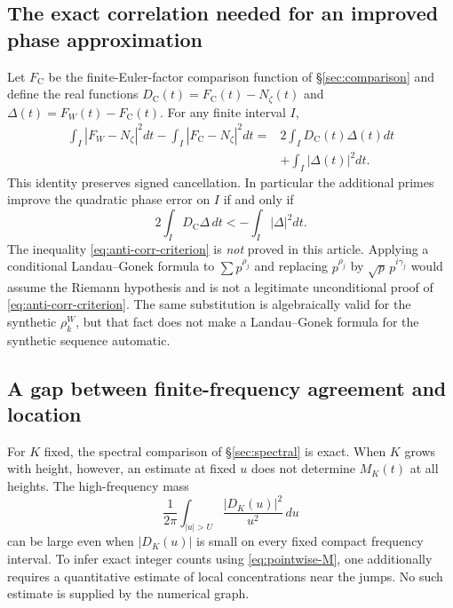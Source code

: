 \documentclass[11pt,leqno]{amsart}
\numberwithin{equation}{section}
\theoremstyle{definition}
\theoremstyle{remark}
\newcommand{\1}{\mathbf 1}
\begin{document}
\subsection{The exact correlation needed for an improved phase approximation}
Let $F_{\mathrm C}$ be the finite-Euler-factor comparison function of \S\ref{sec:comparison} and define the real functions $D_{\mathrm C}(t)=F_{\mathrm C}(t)-N_\zeta(t)$ and $\Delta(t)=F_W(t)-F_{\mathrm C}(t)$. For any finite interval $I$,
\begin{equation}\label{eq:anti-corr-exact}
 \boxed{\begin{aligned}
 \int_I|F_W-N_\zeta|^2dt-\int_I|F_{\mathrm C}-N_\zeta|^2dt
 ={}&2\int_I D_{\mathrm C}(t)\Delta(t)dt\\
 &+\int_I|\Delta(t)|^2dt.
 \end{aligned}}
\end{equation}
This identity preserves signed cancellation. In particular the additional primes improve the quadratic phase error on $I$ if and only if
\begin{equation}\label{eq:anti-corr-criterion}
 2\int_I D_{\mathrm C}\Delta\,dt<-\int_I|\Delta|^2dt.
\end{equation}
The inequality \eqref{eq:anti-corr-criterion} is \emph{not} proved in this article. Applying a conditional Landau--Gonek formula to $\sum p^{\rho_j}$ and replacing $p^{\rho_j}$ by $\sqrt p\,p^{i\gamma_j}$ would assume the Riemann hypothesis and is not a legitimate unconditional proof of \eqref{eq:anti-corr-criterion}. The same substitution is algebraically valid for the synthetic $\rho^W_k$, but that fact does not make a Landau--Gonek formula for the synthetic sequence automatic.
\subsection{A gap between finite-frequency agreement and location}
For $K$ fixed, the spectral comparison of \S\ref{sec:spectral} is exact. When $K$ grows with height, however, an estimate at fixed $u$ does not determine $M_K(t)$ at all heights. The high-frequency mass
\begin{equation}\label{eq:critical-mass}
 \frac1{2\pi}\int_{|u|>U}\frac{|D_K(u)|^2}{u^2}\,du
\end{equation}
can be large even when $|D_K(u)|$ is small on every fixed compact frequency interval. To infer exact integer counts using \eqref{eq:pointwise-M}, one additionally requires a quantitative estimate of local concentrations near the jumps. No such estimate is supplied by the numerical graph.
\end{document}
